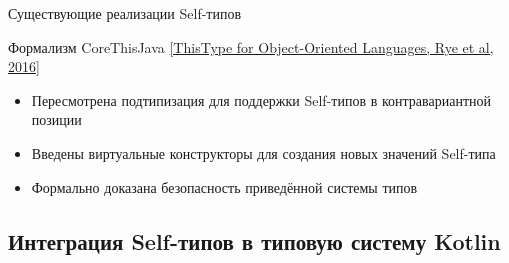 \documentclass[aspectratio=169,usenames,dvipsnames]{beamer}
\begin{document}
\begin{frame}[fragile]{Существующие реализации Self-типов}
        \begin{block}{Формализм CoreThisJava \href{https://dl.acm.org/doi/pdf/10.1145/2888392}{[ThisType for Object-Oriented Languages, Rye et al, 2016]}}
            \begin{itemize}
                \item Пересмотрена подтипизация для поддержки Self-типов в контравариантной позиции
                \item Введены виртуальные конструкторы для создания новых значений Self-типа
                \item Формально доказана безопасность приведённой системы типов
            \end{itemize}
        \end{block}
    \end{frame}


    \subsection{Интеграция Self-типов в типовую систему Kotlin}
\end{document}

